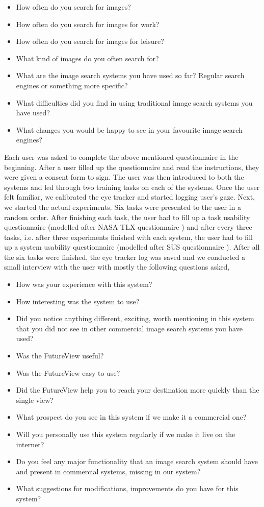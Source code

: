 \documentclass[english]{tktltiki}
\begin{document}
\begin{itemize}
	\item How often do you search for images?
	\item How often do you search for images for work?
	\item How often do you search for images for leisure?
	\item What kind of images do you often search for?
	\item What are the image search systems you have used so far? Regular search engines or something more specific?
	\item What difficulties did you find in using traditional image search systems you have used?
	\item What changes you would be happy to see in your favourite image search engines?
\end{itemize}


Each user was asked to complete the above mentioned questionnaire in the beginning. After a user filled up the questionnaire and read the instructions, they were given a consent form to sign. The user was then introduced to both the systems and led through two training tasks on each of the systems. Once the user felt familiar, we calibrated the eye tracker and started logging user's gaze. Next, we started the actual experiments. Six tasks were presented to the user in a random order. After finishing each task, the user had to fill up a task usability questionnaire (modelled after NASA TLX questionnaire \cite{NASA_TLX}) and after every three tasks, i.e. after three experiments finished with each system, the user had to fill up a system usability questionnaire (modelled after SUS questionnaire \cite{sus}). After all the six tasks were finished, the eye tracker log was saved and we conducted a small interview with the user with mostly the following questions asked,

\begin{itemize}
	\item How was your experience with this system?
	\item How interesting was the system to use?
	\item Did you notice anything different, exciting, worth mentioning in this system that you did not see in other commercial image search systems you have used?
	\item Was the FutureView useful?
	\item Was the FutureView easy to use?
	\item Did the FutureView help you to reach your destination more quickly than the single view?
	\item What prospect do you see in this system if we make it a commercial one?
	\item Will you personally use this system regularly if we make it live on the internet?
	\item Do you feel any major functionality that an image search system should have and present in commercial systems, missing in our system?
	\item What suggestions for modifications, improvements do you have for this system?
\end{itemize}
\end{document}
